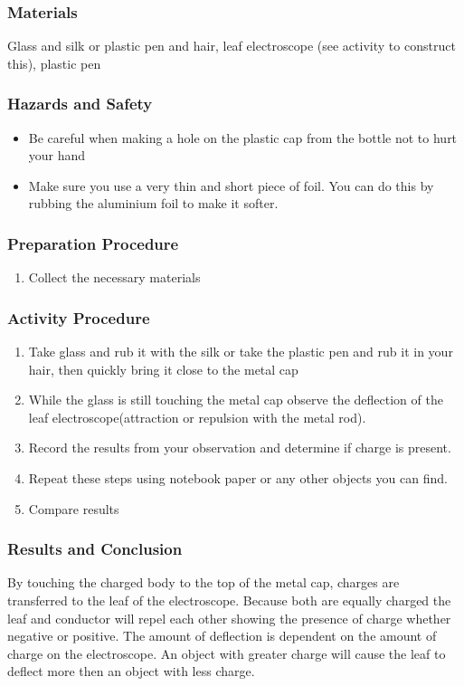 \subsubsection*{Materials}
Glass and silk or plastic pen and hair, leaf electroscope (see activity to construct this), plastic pen

\subsubsection*{Hazards and Safety}
\begin{itemize}
\item{Be careful when making a hole on the plastic cap from the bottle not to hurt your hand}
\item{Make sure you use a very thin and short piece of foil.  You can do this by rubbing the aluminium foil to make it softer.} 
\end{itemize}

\subsubsection*{Preparation Procedure}
\begin{enumerate}
\item{Collect the necessary materials}
\end{enumerate}

\subsubsection*{Activity Procedure}
\begin{enumerate}
\item{Take glass and rub it with the silk or take the plastic pen and rub it in your hair, then quickly bring it close to the metal cap}
\item{While the glass is still touching the metal cap observe the deflection of the leaf electroscope(attraction or repulsion with the metal rod).} 
\item{Record the results from your observation and determine if charge is present.} 
\item{Repeat these steps using notebook paper or any other objects you can find.} 
\item{Compare results}
\end{enumerate}

\subsubsection*{Results and Conclusion}
By touching the charged body to the top of the metal cap, charges are transferred to the leaf of the electroscope. Because both are equally charged the leaf and conductor will repel each other showing the presence of charge whether negative or positive.
The amount of deflection is dependent on the amount of charge on the electroscope. An object with greater charge will cause the leaf to deflect more then an object with less charge.  

